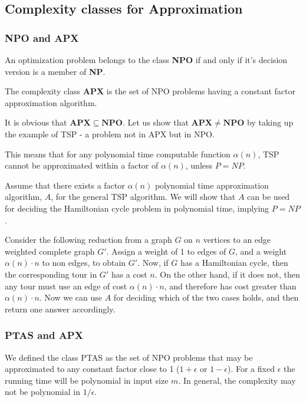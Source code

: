 \documentclass[12pt,letterpaper]{article}
\theoremstyle{definition}
\begin{document}
\subsection{Complexity classes for Approximation}

\subsubsection{NPO and APX}

An optimization problem belongs to the class \textbf{NPO}  if and only if it's decision version is a member of \textbf{NP}.

The complexity class \textbf{APX} is the set of NPO problems having a constant factor approximation algorithm.

It is obvious that $\mathbf{APX} \subseteq \mathbf{NPO}$. Let us show that $\mathbf{APX} \neq \mathbf{NPO}$ by taking up the example of TSP - a problem not in APX but in NPO.

This means that for any polynomial time computable function $\alpha(n)$, TSP cannot be approximated within a factor of $\alpha(n)$, unless $P = NP$.

Assume that there exists a factor $\alpha(n)$ polynomial time approximation algorithm, $A$, for the general TSP algorithm. We will show that $A$ can be used for deciding the Hamiltonian cycle problem in polynomial time, implying $P=NP$.

Consider the following reduction from a graph $G$ on $n$ vertices to an edge weighted complete graph $G'$. Assign a weight of 1 to edges of $G$, and a weight $\alpha(n) \cdot n$ to non edges, to obtain $G'$. Now, if $G$ has a Hamiltonian cycle, then the corresponding tour in $G'$ has a cost $n$. On the other hand, if it does not, then any tour must use an edge of cost $\alpha(n) \cdot n$, and therefore has cost greater than $\alpha(n) \cdot n$. Now we can use $A$ for deciding which of the two cases holds, and then return one answer accordingly.

\subsubsection{PTAS and APX}

We defined the class PTAS as the set of NPO problems that may be approximated to any constant factor close to 1 ($1 + \epsilon$ or $1 - \epsilon$). For a fixed $\epsilon$ the running time will be polynomial in input size $m$. In general, the complexity may not be polynomial in $1/\epsilon$.
\end{document}
